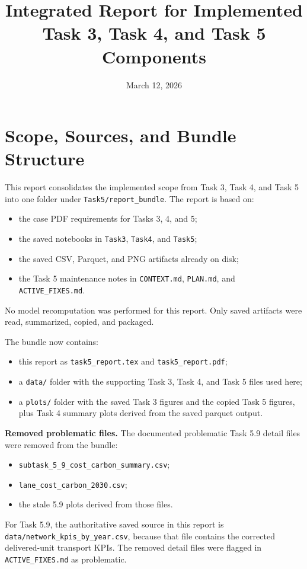 \documentclass[11pt]{article}
\title{Integrated Report for Implemented Task 3, Task 4, and Task 5 Components}
\author{}
\date{March 12, 2026}
\begin{document}
\maketitle

\section{Scope, Sources, and Bundle Structure}

This report consolidates the implemented scope from Task 3, Task 4, and Task 5 into
one folder under \texttt{Task5/report\_bundle}. The report is based on:
\begin{itemize}
  \item the case PDF requirements for Tasks 3, 4, and 5;
  \item the saved notebooks in \texttt{Task3}, \texttt{Task4}, and \texttt{Task5};
  \item the saved CSV, Parquet, and PNG artifacts already on disk;
  \item the Task 5 maintenance notes in \texttt{CONTEXT.md}, \texttt{PLAN.md}, and
  \texttt{ACTIVE\_FIXES.md}.
\end{itemize}

No model recomputation was performed for this report. Only saved artifacts were read,
summarized, copied, and packaged.

The bundle now contains:
\begin{itemize}
  \item this report as \texttt{task5\_report.tex} and \texttt{task5\_report.pdf};
  \item a \texttt{data/} folder with the supporting Task 3, Task 4, and Task 5 files used here;
  \item a \texttt{plots/} folder with the saved Task 3 figures and the copied Task 5 figures,
  plus Task 4 summary plots derived from the saved parquet output.
\end{itemize}

\textbf{Removed problematic files.} The documented problematic Task 5.9 detail files were
removed from the bundle:
\begin{itemize}
  \item \texttt{subtask\_5\_9\_cost\_carbon\_summary.csv};
  \item \texttt{lane\_cost\_carbon\_2030.csv};
  \item the stale 5.9 plots derived from those files.
\end{itemize}

For Task 5.9, the authoritative saved source in this report is
\texttt{data/network\_kpis\_by\_year.csv}, because that file contains the corrected
delivered-unit transport KPIs. The removed detail files were flagged in
\texttt{ACTIVE\_FIXES.md} as problematic.
\end{document}
